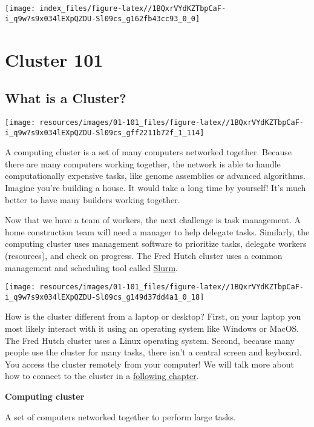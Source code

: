 \documentclass[
]{book}
\begin{document}
\texttt{[image: index\_files/figure-latex//1BQxrVYdKZTbpCaF-i\_q9w7s9x034lEXpQZDU-Sl09cs\_g162fb43cc93\_0\_0]}

\hypertarget{part-cluster-101}{%
\part*{Cluster 101}\label{part-cluster-101}}

\hypertarget{what-is-a-cluster}{%
\chapter{What is a Cluster?}\label{what-is-a-cluster}}

\texttt{[image: resources/images/01-101\_files/figure-latex//1BQxrVYdKZTbpCaF-i\_q9w7s9x034lEXpQZDU-Sl09cs\_gff2211b72f\_1\_114]}

A computing cluster is a set of many computers networked together. Because there are many computers working together, the network is able to handle computationally expensive tasks, like genome assemblies or advanced algorithms. Imagine you're building a house. It would take a long time by yourself! It's much better to have many builders working together.

Now that we have a team of workers, the next challenge is task management. A home construction team will need a manager to help delegate tasks. Similarly, the computing cluster uses management software to prioritize tasks, delegate workers (resources), and check on progress. The Fred Hutch cluster uses a common management and scheduling tool called \href{https://slurm.schedmd.com/overview.html}{Slurm}.

\texttt{[image: resources/images/01-101\_files/figure-latex//1BQxrVYdKZTbpCaF-i\_q9w7s9x034lEXpQZDU-Sl09cs\_g149d37dd4a1\_0\_18]}

How is the cluster different from a laptop or desktop? First, on your laptop you most likely interact with it using an operating system like Windows or MacOS. The Fred Hutch cluster uses a Linux operating system. Second, because many people use the cluster for many tasks, there isn't a central screen and keyboard. You access the cluster remotely from your computer! We will talk more about how to connect to the cluster in a \protect\hyperlink{terminal}{following chapter}.

\textbf{Computing cluster}

A set of computers networked together to perform large tasks.
\end{document}
